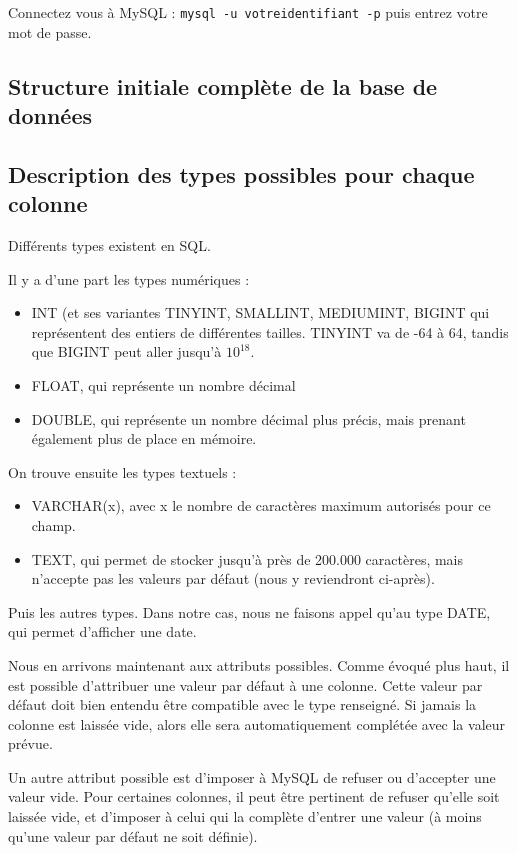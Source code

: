 \documentclass[12pt,a4paper]{article}
\begin{document}
        Connectez vous à MySQL : \verb+mysql -u votreidentifiant -p+ puis entrez votre mot de passe.





\clearpage
\appendix
    \subsection{Structure initiale complète de la base de données}\label{structureinitiale}

    \subsection{Description des types possibles pour chaque colonne}\label{types}
        Différents types existent en SQL.
        
        Il y a d'une part les types numériques :
        \begin{itemize}
            \item INT (et ses variantes TINYINT, SMALLINT, MEDIUMINT, BIGINT qui représentent
            des entiers de différentes tailles. TINYINT va de -64 à 64, 
            tandis que BIGINT peut aller jusqu'à $10^{18}$.
            \item FLOAT, qui représente un nombre décimal 
            \item DOUBLE, qui représente un nombre décimal plus précis,
            mais prenant également plus de place en mémoire.
        \end{itemize}

        On trouve ensuite les types textuels :
        \begin{itemize}
            \item VARCHAR(x), avec x le nombre de caractères maximum autorisés
            pour ce champ.
            \item TEXT, qui permet de stocker jusqu'à près de 200.000 caractères,
            mais n'accepte pas les valeurs par défaut (nous y reviendront ci-après).
        \end{itemize}

        Puis les autres types. Dans notre cas, nous ne faisons appel
        qu'au type DATE, qui permet d'afficher une date.

        Nous en arrivons maintenant aux attributs possibles.
        Comme évoqué plus haut, il est possible d'attribuer une valeur
        par défaut à une colonne. Cette valeur par défaut doit bien entendu
        être compatible avec le type renseigné. Si jamais la colonne est laissée
        vide, alors elle sera automatiquement complétée avec la valeur prévue.

        Un autre attribut possible est d'imposer à MySQL de refuser ou
        d'accepter une valeur vide. Pour certaines colonnes, il peut être
        pertinent de refuser qu'elle soit laissée vide, et d'imposer à celui
        qui la complète d'entrer une valeur (à moins qu'une valeur par défaut
        ne soit définie).
\end{document}
